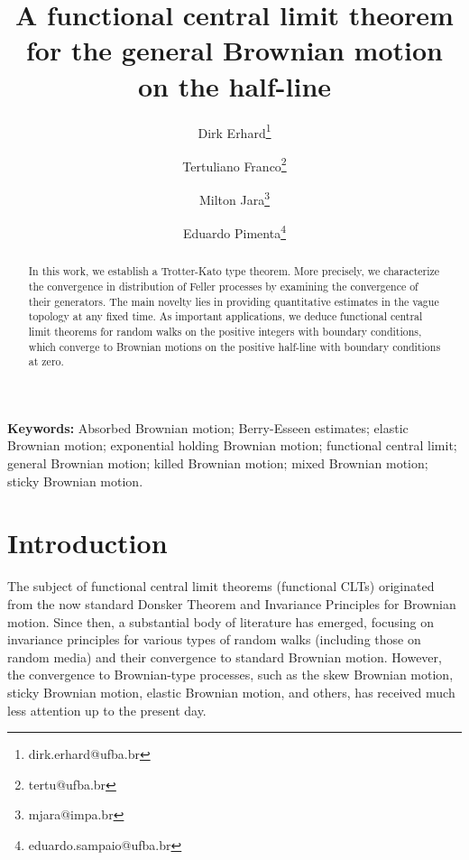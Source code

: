\documentclass[12pt,a4paper]{article}
\theoremstyle{plain}
\theoremstyle{remark}
\begin{document}
	
	\title{A functional central limit theorem for the general Brownian motion on the half-line}

	\author[1]{Dirk Erhard\thanks{dirk.erhard@ufba.br}}
	\author[1]{Tertuliano Franco\thanks{tertu@ufba.br}}
	\author[2]{Milton Jara\thanks{mjara@impa.br}}
	\author[1]{Eduardo Pimenta\thanks{eduardo.sampaio@ufba.br}}


	\date{}

	\maketitle

	\begin{abstract}
		In this work, we establish a Trotter-Kato type theorem. More precisely, we characterize the convergence in distribution of Feller processes by examining the convergence of their generators. The main novelty lies in providing quantitative estimates in the vague topology at any fixed time. As important applications, we deduce functional central limit theorems for random walks on the positive integers with boundary conditions, which converge to Brownian motions on the positive half-line with boundary conditions at zero.
	\end{abstract}

	\noindent\textbf{Keywords:} Absorbed Brownian motion; Berry-Esseen estimates; elastic Brownian motion; exponential holding Brownian motion; functional central limit; general Brownian motion; killed Brownian motion; mixed Brownian motion; sticky Brownian motion.

	
	
	
	
	\section{Introduction}\label{s1}
	
	The subject of functional central limit theorems (functional CLTs) originated from the now standard Donsker Theorem and Invariance Principles for Brownian motion. Since then, a substantial body of literature has emerged, focusing on invariance principles for various types of random walks (including those on random media) and their convergence to standard Brownian motion.
	However, the convergence to Brownian-type processes, such as the skew Brownian motion, sticky Brownian motion, elastic Brownian motion, and others, has received much less attention up to the present day.
	
\end{document}
